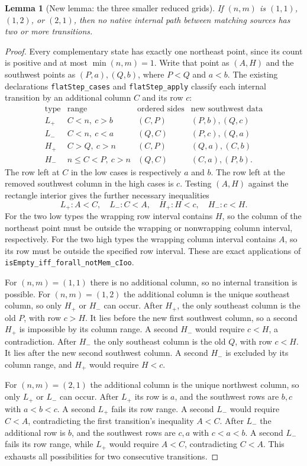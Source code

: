 \documentclass[11pt,oneside]{report}
\newtheorem{lemma}[theorem]{Lemma}
\theoremstyle{definition}
\numberwithin{equation}{section}
\newcommand{\decl}[1]{\textnormal{\nolinkurl{#1}}}
\begin{document}
\begin{lemma}[New lemma: the three smaller reduced grids]
\label{J06:lem:seam-thin-small-truncation}
If $(n,m)$ is $(1,1)$, $(1,2)$, or $(2,1)$, then no native internal
path between matching sources has two or more transitions.
\end{lemma}
\begin{proof}
Every complementary state has exactly one northeast point, since its
count is positive and at most $\min(n,m)=1$.
Write that point as $(A,H)$ and the southwest points as $(P,a),(Q,b)$,
where $P<Q$ and $a<b$. The existing declarations
\decl{flatStep_cases} and \decl{flatStep_apply} classify each internal
transition by an additional column $C$ and its row $c$:
\[
\begin{array}{c|c|c|c}
\text{type}&\text{range}&\text{ordered sides}&\text{new southwest data}\\\hline
L_+&C<n,\ c>b&(C,P)&(P,b),(Q,c)\\
L_-&C<n,\ c<a&(Q,C)&(P,c),(Q,a)\\
H_+&C>Q,\ c>n&(C,P)&(Q,a),(C,b)\\
H_-&n\le C<P,\ c>n&(Q,C)&(C,a),(P,b).
\end{array}
\]
The row left at $C$ in the low cases is respectively $a$ and $b$.
The row left at the removed southwest column in the high cases is $c$.
Testing $(A,H)$ against the rectangle interior gives the further
necessary inequalities
\[
 L_+:A<C,\quad L_-:C<A,\quad H_+:H<c,\quad H_-:c<H.
\]
For the two low types the wrapping row interval contains $H$, so the
column of the northeast point must be outside the wrapping or
nonwrapping column interval, respectively. For the two high types the
wrapping column interval contains $A$, so its row must be outside the
specified row interval. These are exact applications of
\decl{isEmpty_iff_forall_notMem_cIoo}.

For $(n,m)=(1,1)$ there is no additional column, so no internal
transition is possible.
For $(n,m)=(1,2)$ the additional column is the unique southeast column,
so only $H_+$ or $H_-$ can occur. After $H_+$, the only southeast
column is the old $P$, with row $c>H$. It lies before the new first
southwest column, so a second $H_+$ is impossible by its column range.
A second $H_-$ would require $c<H$, a contradiction.
After $H_-$ the only southeast column is the old $Q$, with row $c<H$.
It lies after the new second southwest column. A second $H_-$ is
excluded by its column range, and $H_+$ would require $H<c$.

For $(n,m)=(2,1)$ the additional column is the unique northwest column,
so only $L_+$ or $L_-$ can occur. After $L_+$ its row is $a$, and the
southwest rows are $b,c$ with $a<b<c$. A second $L_+$ fails its row
range. A second $L_-$ would require $C<A$, contradicting the first
transition's inequality $A<C$. After $L_-$ the additional row is $b$,
and the southwest rows are $c,a$ with $c<a<b$. A second $L_-$ fails
its row range, while $L_+$ would require $A<C$, contradicting $C<A$.
This exhausts all possibilities for two consecutive transitions.
\end{proof}
\end{document}
